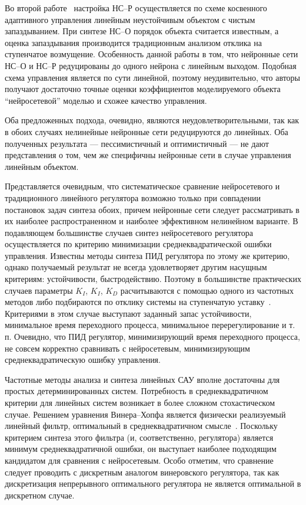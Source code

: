 Во второй работе~\cite{toudeft} настройка НС--Р осуществляется по
схеме косвенного адаптивного управления линейным неустойчивым объектом
с чистым запаздыванием.  При синтезе НС--О порядок объекта считается
известным, а оценка запаздывания производится традиционным анализом
отклика на ступенчатое возмущение.  Особенность данной работы в том,
что нейронные сети НС--О и НС--Р редуцированы до одного нейрона с
линейным выходом.  Подобная схема управления является по сути
линейной, поэтому неудивительно, что авторы получают достаточно точные
оценки коэффициентов моделируемого объекта ``нейросетевой'' моделью и
схожее качество управления.

Оба предложенных подхода, очевидно, являются неудовлетворительными,
так как в обоих случаях нелинейные нейронные сети редуцируются до
линейных.  Оба полученных результата --- пессимистичный и
оптимистичный --- не дают представления о том, чем же специфичны
нейронные сети в случае управления линейным объектом.

Представляется очевидным, что систематическое сравнение нейросетевого
и традиционного линейного регулятора возможно только при совпадении
постановок задач синтеза обоих, причем нейронные сети следует
рассматривать в их наиболее распространенном и наиболее эффективном
нелинейном варианте.  В подавляющем большинстве случаев синтез
нейросетевого регулятора осуществляется по критерию минимизации
среднеквадратической ошибки управления.  Известны методы синтеза ПИД
регулятора по этому же критерию, однако получаемый результат не всегда
удовлетворяет другим насущным критериям: устойчивости, быстродействию.
Поэтому в большинстве практических случаев параметры $K_I$, $K_I$,
$K_D$ расчитываются с помощью одного из частотных методов либо
подбираются по отклику системы на ступенчатую
уставку~\cite{kurop73,netush68}.  Критериями в этом случае
выступают заданный запас устойчивости, минимальное время переходного
процесса, минимальное перерегулирование и т. п.  Очевидно, что ПИД
регулятор, минимизирующий время переходного процесса, не совсем
корректно сравнивать с нейросетевым, минимизирующим среднеквадратическую
ошибку управления.


Частотные методы анализа и синтеза линейных САУ вполне достаточны для
простых детерминированных систем.  Потребность в среднеквадратичном
критерии для линейных систем возникает в более сложном стохастическом
случае.  Решением уравнения Винера--Хопфа является физически
реализуемый линейный фильтр, оптимальный в среднеквадратичном
смысле~\cite{solod60,skliar65,ostrem73,tsipkin58}.
Поскольку критерием синтеза этого фильтра (и, соответственно,
регулятора) является минимум среднеквадратичной ошибки, он выступает
наиболее подходящим кандидатом для сравнения с нейросетевым.  Особо
отметим, что сравнение следует проводить с дискретным аналогом
винеровского регулятора, так как дискретизация непрерывного
оптимального регулятора не является оптимальной в дискретном случае.


